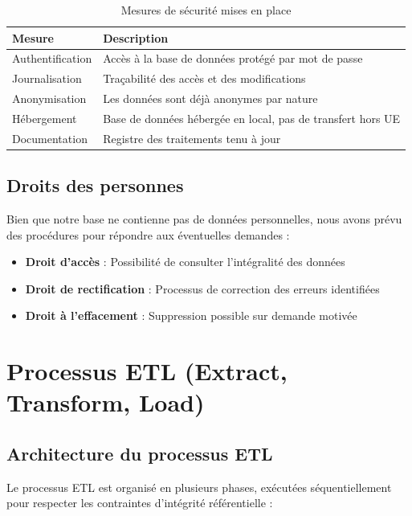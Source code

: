 \documentclass[12pt,a4paper]{article}
\begin{document}
\begin{table}[h!]
\centering
\begin{tabular}{|p{4cm}|p{10.5cm}|}
\hline
\textbf{Mesure} & \textbf{Description} \\
\hline
Authentification & Accès à la base de données protégé par mot de passe \\
\hline
Journalisation & Traçabilité des accès et des modifications \\
\hline
Anonymisation & Les données sont déjà anonymes par nature \\
\hline
Hébergement & Base de données hébergée en local, pas de transfert hors UE \\
\hline
Documentation & Registre des traitements tenu à jour \\
\hline
\end{tabular}
\caption{Mesures de sécurité mises en place}
\end{table}

\subsection{Droits des personnes}

Bien que notre base ne contienne pas de données personnelles, nous avons prévu des procédures pour répondre aux éventuelles demandes :
\begin{itemize}
    \item \textbf{Droit d'accès} : Possibilité de consulter l'intégralité des données
    \item \textbf{Droit de rectification} : Processus de correction des erreurs identifiées
    \item \textbf{Droit à l'effacement} : Suppression possible sur demande motivée
\end{itemize}

\section{Processus ETL (Extract, Transform, Load)}

\subsection{Architecture du processus ETL}

Le processus ETL est organisé en plusieurs phases, exécutées séquentiellement pour respecter les contraintes d'intégrité référentielle :
\end{document}

